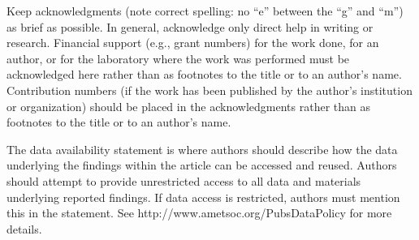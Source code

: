 \documentclass{ametsocV6.1}
\begin{document}
\clearpage
\acknowledgments
Keep acknowledgments (note correct spelling: no ``e'' between the ``g'' and
``m'') as brief as possible. In general, acknowledge only direct help in
writing or research. Financial support (e.g., grant numbers) for the work done, 
for an author, or for the laboratory where the work was performed must be 
acknowledged here rather than as footnotes to the title or to an author's name.
Contribution numbers (if the work has been published by the author's institution 
or organization) should be placed in the acknowledgments rather than as 
footnotes to the title or to an author's name.

% 
%
\datastatement
The data availability statement is where authors should describe how the data underlying 
the findings within the article can be accessed and reused. Authors should attempt to 
provide unrestricted access to all data and materials underlying reported findings. 
If data access is restricted, authors must mention this in the statement.
See http://www.ametsoc.org/PubsDataPolicy for more details.









%
\end{document}
